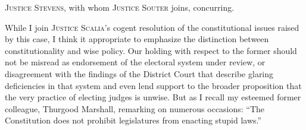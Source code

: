 
\setcounter{page}{209}

  \textsc{Justice Stevens,} with whom \textsc{Justice Souter} joins, concurring.

  While I join \textsc{Justice Scalia'}s cogent resolution of the constitutional issues raised by this case, I think it appropriate to emphasize the distinction between constitutionality and wise policy. Our holding with respect to the former should not be misread as endorsement of the electoral system under review, or disagreement with the findings of the District Court that describe glaring deficiencies in that system and even lend support to the broader proposition that the very practice of electing judges is unwise. But as I recall my esteemed former colleague, Thurgood Marshall, remarking on numerous occasions: ``The Constitution does not prohibit legislatures from enacting stupid laws.''

